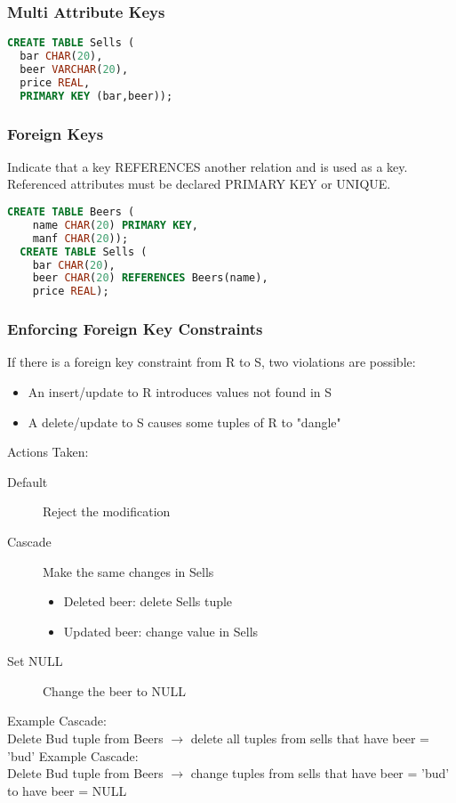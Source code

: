 \documentclass[12pt]{article}
\begin{document}
\subsubsection{Multi Attribute Keys}
\begin{lstlisting}[language=sql,caption=tuple as a primary key]
  CREATE TABLE Sells (
  bar CHAR(20),
  beer VARCHAR(20),
  price REAL,
  PRIMARY KEY (bar,beer));
\end{lstlisting}

\subsubsection{Foreign Keys}
Indicate that a key REFERENCES another relation and is used as a key.\\
Referenced attributes must be declared PRIMARY KEY or UNIQUE.
\begin{lstlisting}[language=sql,caption=Foreign key]
  CREATE TABLE Beers (
    name CHAR(20) PRIMARY KEY,
    manf CHAR(20));
  CREATE TABLE Sells (
    bar CHAR(20),
    beer CHAR(20) REFERENCES Beers(name),
    price REAL);
\end{lstlisting}
\subsubsection{Enforcing Foreign Key Constraints}
If there is a foreign key constraint from R to S, two violations are possible:
\begin{itemize}
  \item An insert/update to R introduces values not found in S
  \item A delete/update to S causes some tuples of R to "dangle"
\end{itemize}
Actions Taken:
\begin{description}
  \item[Default] Reject the modification
  \item[Cascade] {
      Make the same changes in Sells
      \begin{itemize}
        \item Deleted beer: delete Sells tuple
        \item Updated beer: change value in Sells
      \end{itemize}
    }
  \item[Set NULL] Change the beer to NULL
\end{description}

Example Cascade:\\
Delete Bud tuple from Beers $\rightarrow$ delete all tuples from sells that have
beer = 'bud'
Example Cascade:\\
Delete Bud tuple from Beers $\rightarrow$ change tuples from sells that have
beer = 'bud' to have beer = NULL
\end{document}
